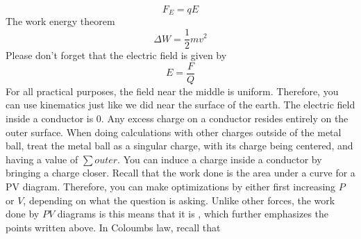 {}$$ F_E = qE $$\markdownRendererInterblockSeparator
{}\markdownRendererUlBegin
\markdownRendererUlItem The work energy theorem $$\Delta W = \frac{1}{2}mv^2$$\markdownRendererUlItemEnd 
\markdownRendererUlItem Please don't forget that the electric field is given by $$E = \frac{F}{Q}$$\markdownRendererUlItemEnd 
\markdownRendererUlEnd \markdownRendererInterblockSeparator
{}\markdownRendererInterblockSeparator
{}For all practical purposes, the field near the middle is uniform. Therefore, you can use kinematics just like we did near the surface of the earth.\markdownRendererInterblockSeparator
{}\markdownRendererInterblockSeparator
{}\markdownRendererUlBeginTight
\markdownRendererUlItem The electric field inside a conductor is $0$.\markdownRendererUlItemEnd 
\markdownRendererUlItem Any excess charge on a conductor resides entirely on the outer surface.\markdownRendererUlItemEnd 
\markdownRendererUlItem When doing calculations with other charges outside of the metal ball, treat the metal ball as a singular charge, with its charge being centered, and having a value of $\sum outer$.\markdownRendererUlItemEnd 
\markdownRendererUlItem You can induce a charge inside a conductor by bringing a charge closer.\markdownRendererUlItemEnd 
\markdownRendererUlEndTight \markdownRendererInterblockSeparator
{}\markdownRendererInterblockSeparator
{}\markdownRendererUlBeginTight
\markdownRendererUlItem Recall that the work done is the area under a curve for a PV diagram. Therefore, you can make optimizations by either first increasing $P$ or $V$, depending on what the question is asking.\markdownRendererUlItemEnd 
\markdownRendererUlItem Unlike other forces, the work done by $PV$ diagrams is  this means that it is , which further emphasizes the points written above.\markdownRendererUlItemEnd 
\markdownRendererUlEndTight \markdownRendererInterblockSeparator
{}\markdownRendererInterblockSeparator
{}\markdownRendererInterblockSeparator
{}\markdownRendererUlBeginTight
\markdownRendererUlItem In Coloumbs law, recall that\markdownRendererUlItemEnd 
\markdownRendererUlEndTight \relax